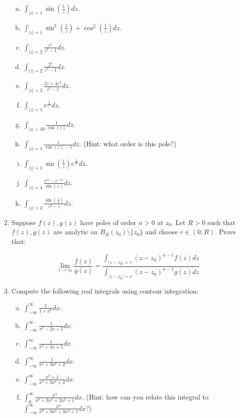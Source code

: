 \begin{enumerate}
\begin{enumerate}[a)]

\item $\int_{|z| = 1} \sin\left(\frac{1}{z}\right)dz$.
\item $\int_{|z| = 1} \sin^2\left(\frac{1}{z}\right) + \cos^2\left(\frac{1}{z}\right)dz$.
\item $\int_{|z| = 2} \frac{e^z}{z^3-1}dz$.
\item $\int_{|z| = 2} \frac{2^z}{z^4-1}dz$.
\item $\int_{|z| = 2} \frac{2z+ 4z^3}{z^5-1}dz$.
\item $\int_{|z| = 1} e^{\frac{1}{z^n}}dz$.
\item $\int_{|z| = 10} \frac{1}{\cos(z)}dz$.
\item $\int_{|z| = 1} \frac{z}{\cos(z) - 1}dz$. (Hint: what order is this pole?)
\item $\int_{|z| = 1} \sin\left(\frac{1}{z}\right)e^{\frac{1}{z^n}}dz$.
\item $\int_{|z| = 4} \frac{e^{iz} - e^{-iz}}{\sin(z)}dz$.
\item $\int_{|z| = 2} \frac{\sin\left(\frac{1}{z}\right)}{z^2 - z}dz$.
\end{enumerate}


\item Suppose $f(z), g(z)$ have poles of order $n > 0$ at $z_0$. Let $R > 0$ such that $f(z), g(z)$ are analytic on $B_R(z_0)\setminus\{z_0\}$ and choose $r\in (0,R)$. Prove that:

$$\lim_{z\rightarrow z_0} \frac{f(z)}{g(z)} = \frac{\int_{|z - z_0| = r} (z-z_0)^{n-1}f(z)dz}{\int_{|z - z_0| = r} (z-z_0)^{n-1}g(z)dz}$$



\item Compute the following real integrals using contour integration:

\begin{enumerate}[a)]
\item $\int_{-\infty}^\infty \frac{1}{1 + x^6}dx$.
\item $\int_{-\infty}^\infty \frac{1}{x^2 - 2x + 2}dx$.
\item $\int_{-\infty}^\infty \frac{1}{x^2 + 4x + 5}dx$.
\item $\int_{-\infty}^\infty \frac{1}{x^4 + 3x^2 + 2}dx$.
\item $\int_{-\infty}^\infty \frac{x^3 + 1}{x^4 + 3x^2 +2}dx$.
\item $\int_0^\infty \frac{x^4}{x^6 + 3x^4 + 3x^2 + 1}dx$. (Hint: how can you relate this integral to $\int_{-\infty}^\infty\frac{x^4}{x^6 + 3x^4 + 3x^2 + 1}dx$?)
\end{enumerate}


\end{enumerate}
